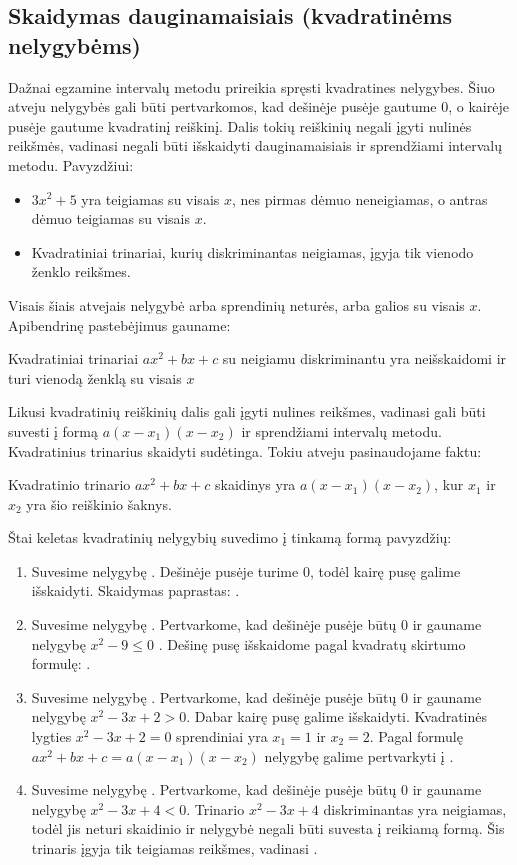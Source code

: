 \documentclass[a4paper,png]{article}
\begin{document}
\subsection*{Skaidymas dauginamaisiais (kvadratinėms nelygybėms)}
Dažnai egzamine intervalų metodu prireikia spręsti kvadratines nelygybes. Šiuo atveju nelygybės gali būti pertvarkomos, kad dešinėje pusėje gautume $0$, o kairėje pusėje gautume kvadratinį reiškinį. Dalis tokių reiškinių negali įgyti nulinės reikšmės, vadinasi negali būti išskaidyti dauginamaisiais ir sprendžiami intervalų metodu. Pavyzdžiui:
\begin{itemize}
\item $3x^2+5$ yra teigiamas su visais $x$, nes pirmas dėmuo neneigiamas, o antras dėmuo teigiamas su visais $x$. 
\item Kvadratiniai trinariai, kurių diskriminantas neigiamas, įgyja tik vienodo ženklo reikšmes.
\end{itemize} 
Visais šiais atvejais nelygybė arba sprendinių neturės, arba galios su visais $x$. Apibendrinę pastebėjimus gauname:

\begin{mdframed}[backgroundcolor=yellow!50!white]
Kvadratiniai trinariai $ax^2+bx+c$ su neigiamu diskriminantu yra neišskaidomi ir turi vienodą ženklą su visais $x$
\end{mdframed}

Likusi kvadratinių reiškinių dalis gali įgyti nulines reikšmes, vadinasi gali būti suvesti į formą $a(x-x_1)(x-x_2)$ ir sprendžiami intervalų metodu. Kvadratinius trinarius skaidyti sudėtinga. Tokiu atveju pasinaudojame faktu:

\begin{mdframed}[backgroundcolor=yellow!50!white]
Kvadratinio trinario $ax^2+bx+c$ skaidinys yra $a(x-x_1)(x-x_2)$, kur $x_1$ ir $x_2$ yra šio reiškinio šaknys.
\end{mdframed}

Štai keletas kvadratinių nelygybių suvedimo į tinkamą formą pavyzdžių:
\begin{enumerate}
\item Suvesime nelygybę . Dešinėje pusėje turime $0$, todėl kairę pusę galime išskaidyti. Skaidymas paprastas: .
\item Suvesime nelygybę . Pertvarkome, kad dešinėje pusėje būtų $0$ ir gauname nelygybę $x^2 - 9\leq 0$ . Dešinę pusę išskaidome pagal kvadratų skirtumo formulę: .
\item Suvesime nelygybę . Pertvarkome, kad dešinėje pusėje būtų $0$ ir gauname nelygybę
 $x^2-3x+2>0$. Dabar kairę pusę galime išskaidyti. Kvadratinės lygties $x^2-3x+2 = 0$ sprendiniai yra $x_1=1\text{ ir } x_2=2$. Pagal formulę $ax^2+bx+c = a(x-x_1)(x-x_2)$ nelygybę galime pertvarkyti į .
\item Suvesime nelygybę . Pertvarkome, kad dešinėje pusėje būtų $0$ ir gauname nelygybę
 $x^2-3x+4<0$. Trinario $x^2-3x+4$ diskriminantas yra neigiamas, todėl jis neturi skaidinio ir nelygybė negali būti suvesta į reikiamą formą. Šis trinaris įgyja tik teigiamas reikšmes, vadinasi .
\end{enumerate}
\end{document}
